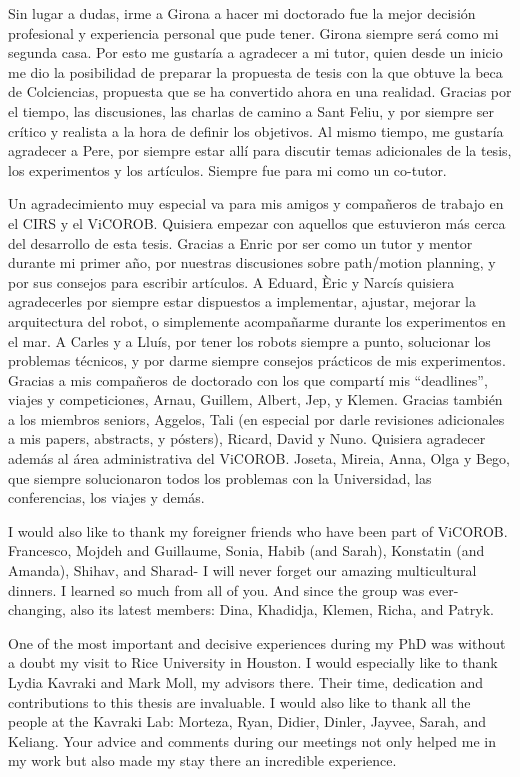 Sin lugar a dudas, irme a Girona a hacer mi doctorado fue la mejor decisión
profesional y experiencia personal que pude tener. Girona siempre será como mi
segunda casa. Por esto me gustaría a agradecer a mi tutor, quien desde un inicio
me dio la posibilidad de preparar la propuesta de tesis con la que obtuve la
beca de Colciencias, propuesta que se ha convertido ahora en una realidad.
Gracias por el tiempo, las discusiones, las charlas de camino a Sant Feliu, y
por siempre ser crítico y realista a la hora de definir los objetivos. Al mismo
tiempo, me gustaría agradecer a Pere, por siempre estar allí para discutir temas
adicionales de la tesis, los experimentos y los artículos. Siempre fue para mi
como un co-tutor.

Un agradecimiento muy especial va para mis amigos y compañeros de trabajo en el
CIRS y el ViCOROB. Quisiera empezar con aquellos que estuvieron más cerca del
desarrollo de esta tesis. Gracias a Enric por ser como un tutor y mentor durante
mi primer año, por nuestras discusiones sobre path/motion planning, y por sus
consejos para escribir artículos. A Eduard, Èric y Narcís quisiera agradecerles
por siempre estar dispuestos a implementar, ajustar, mejorar la arquitectura del
robot, o simplemente acompañarme durante los experimentos en el mar. A Carles y
a Lluís, por tener los robots siempre a punto, solucionar los problemas
técnicos, y por darme siempre consejos prácticos de mis experimentos. Gracias a
mis compañeros de doctorado con los que compartí mis ``deadlines'', viajes y
competiciones, Arnau, Guillem, Albert, Jep, y Klemen. Gracias también a los
miembros seniors, Aggelos, Tali (en especial por darle revisiones adicionales a
mis papers, abstracts, y pósters), Ricard, David y Nuno. Quisiera agradecer
además al área administrativa del ViCOROB. Joseta, Mireia, Anna, Olga y Bego,
que siempre solucionaron todos los problemas con la Universidad, las
conferencias, los viajes y demás.

I would also like to thank my foreigner friends who have been part of ViCOROB.
Francesco, Mojdeh and Guillaume, Sonia, Habib (and Sarah), Konstatin (and
Amanda), Shihav, and Sharad- I will never forget our amazing multicultural
dinners. I learned so much from all of you. And since the group was
ever-changing, also its latest members: Dina, Khadidja, Klemen, Richa, and
Patryk.

One of the most important and decisive experiences during my PhD was without a
doubt my visit to Rice University in Houston. I would especially like to thank
Lydia Kavraki and Mark Moll, my advisors there. Their time, dedication and
contributions to this thesis are invaluable. I would also like to thank all the
people at the Kavraki Lab: Morteza, Ryan, Didier, Dinler, Jayvee, Sarah, and
Keliang. Your advice and comments during our meetings not only helped me in my
work but also made my stay there an incredible experience.

